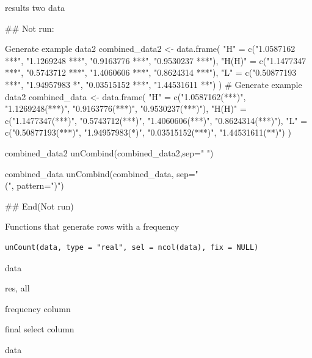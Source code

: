 \documentclass[a4paper]{book}
\begin{document}
%
\begin{Value}
results  two data
\end{Value}
%
\begin{Examples}
\begin{ExampleCode}
\#\# Not run: 

Generate example data2
combined_data2 <- data.frame(
  "H" = c("1.0587162 ***", "1.1269248 ***", "0.9163776 ***", "0.9530237 ***"),
  "H(H)" = c("1.1477347 ***", "0.5743712 ***", "1.4060606 ***", "0.8624314 ***"),
  "L" = c("0.50877193 ***", "1.94957983 *", "0.03515152 ***", "1.44531611 **")
)
# Generate example data2
combined_data <- data.frame(
  "H" = c("1.0587162(***)", "1.1269248(***)", "0.9163776(***)", "0.9530237(***)"),
  "H(H)" = c("1.1477347(***)", "0.5743712(***)", "1.4060606(***)", "0.8624314(***)"),
  "L" = c("0.50877193(***)", "1.94957983(*)", "0.03515152(***)", "1.44531611(**)")
)

combined_data2
unCombind(combined_data2,sep=" ")

combined_data
unCombind(combined_data, sep="\\(", pattern=")")



## End(Not run)
\end{ExampleCode}
\end{Examples}
%
\begin{Description}
Functions that generate rows with a frequency
\end{Description}
%
\begin{Usage}
\begin{verbatim}
unCount(data, type = "real", sel = ncol(data), fix = NULL)
\end{verbatim}
\end{Usage}
%
\begin{Arguments}
\begin{ldescription}
\item[\code{data}] data

\item[\code{type}] res, all

\item[\code{sel}] frequency column

\item[\code{fix}] final select column
\end{ldescription}
\end{Arguments}
%
\begin{Value}
data
\end{Value}
\end{document}
